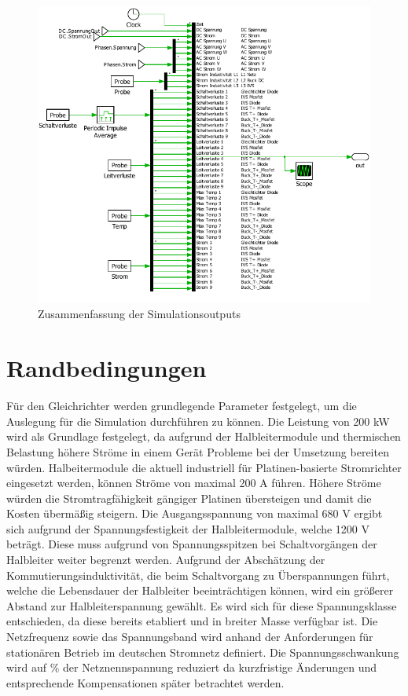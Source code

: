 \begin{figure}
\centering
\includegraphics[width=1\linewidth]{content/Grafiken/Plecs_Out}
\caption{Zusammenfassung der Simulationsoutputs}
\label{fig:plecsout}
\end{figure}


\section{Randbedingungen}
Für den Gleichrichter werden grundlegende Parameter festgelegt, um die Auslegung für die Simulation durchführen zu können. Die Leistung von 200 kW wird als Grundlage festgelegt, da aufgrund der Halbleitermodule und thermischen Belastung höhere Ströme in einem Gerät Probleme bei der Umsetzung bereiten würden. Halbeitermodule die aktuell industriell für Platinen-basierte Stromrichter eingesetzt werden, können Ströme von maximal 200 A führen. Höhere Ströme würden die Stromtragfähigkeit gängiger Platinen übersteigen und damit die Kosten übermäßig steigern. Die Ausgangsspannung von maximal 680 V ergibt sich aufgrund der Spannungsfestigkeit der Halbleitermodule, welche 1200 V beträgt. Diese muss aufgrund von Spannungsspitzen bei Schaltvorgängen der Halbleiter weiter begrenzt werden. Aufgrund der Abschätzung der Kommutierungsinduktivität, die beim Schaltvorgang zu Überspannungen führt, welche die Lebensdauer der Halbleiter beeinträchtigen können, wird ein größerer Abstand zur Halbleiterspannung gewählt. Es wird sich für diese Spannungsklasse entschieden, da diese bereits etabliert und in breiter Masse verfügbar ist. Die Netzfrequenz sowie das Spannungsband wird anhand der Anforderungen für stationären Betrieb im deutschen Stromnetz definiert. Die Spannungsschwankung wird auf  \% der Netznennspannung reduziert da kurzfristige Änderungen und entsprechende Kompensationen später betrachtet werden.  \\

